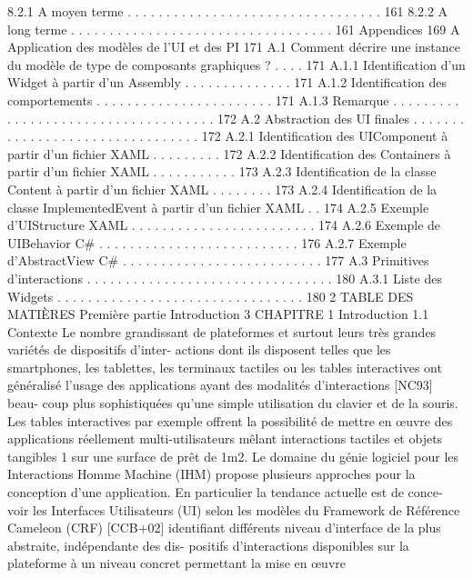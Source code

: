 \documentclass{article}
\begin{document}
8.2.1
A moyen terme . . . . . . . . . . . . . . . . . . . . . . . . . . . . . . . . .
161
8.2.2
A long terme . . . . . . . . . . . . . . . . . . . . . . . . . . . . . . . . . .
161
Appendices
169
A Application des modèles de l’UI et des PI
171
A.1
Comment décrire une instance du modèle de type de composants graphiques ? . . . .
171
A.1.1
Identiﬁcation d’un Widget à partir d’un Assembly
. . . . . . . . . . . . . .
171
A.1.2
Identiﬁcation des comportements
. . . . . . . . . . . . . . . . . . . . . . .
171
A.1.3
Remarque . . . . . . . . . . . . . . . . . . . . . . . . . . . . . . . . . . . .
172
A.2
Abstraction des UI ﬁnales . . . . . . . . . . . . . . . . . . . . . . . . . . . . . . . .
172
A.2.1
Identiﬁcation des UIComponent à partir d’un ﬁchier XAML . . . . . . . . .
172
A.2.2
Identiﬁcation des Containers à partir d’un ﬁchier XAML . . . . . . . . . . .
173
A.2.3
Identiﬁcation de la classe Content à partir d’un ﬁchier XAML . . . . . . . .
173
A.2.4
Identiﬁcation de la classe ImplementedEvent à partir d’un ﬁchier XAML
. .
174
A.2.5
Exemple d’UIStructure XAML
. . . . . . . . . . . . . . . . . . . . . . . .
174
A.2.6
Exemple de UIBehavior C#
. . . . . . . . . . . . . . . . . . . . . . . . . .
176
A.2.7
Exemple d’AbstractView C# . . . . . . . . . . . . . . . . . . . . . . . . . .
177
A.3
Primitives d’interactions
. . . . . . . . . . . . . . . . . . . . . . . . . . . . . . . .
180
A.3.1
Liste des Widgets . . . . . . . . . . . . . . . . . . . . . . . . . . . . . . . .
180
2
TABLE DES MATIÈRES
Première partie
Introduction
3
CHAPITRE 1
Introduction
1.1
Contexte
Le nombre grandissant de plateformes et surtout leurs très grandes variétés de dispositifs d’inter-
actions dont ils disposent telles que les smartphones, les tablettes, les terminaux tactiles ou les tables
interactives ont généralisé l’usage des applications ayant des modalités d’interactions [NC93] beau-
coup plus sophistiquées qu’une simple utilisation du clavier et de la souris. Les tables interactives par
exemple offrent la possibilité de mettre en œuvre des applications réellement multi-utilisateurs mêlant
interactions tactiles et objets tangibles 1 sur une surface de prêt de 1m2.
Le domaine du génie logiciel pour les Interactions Homme Machine (IHM) propose plusieurs
approches pour la conception d’une application. En particulier la tendance actuelle est de conce-
voir les Interfaces Utilisateurs (UI) selon les modèles du Framework de Référence Cameleon
(CRF) [CCB+02] identiﬁant différents niveau d’interface de la plus abstraite, indépendante des dis-
positifs d’interactions disponibles sur la plateforme à un niveau concret permettant la mise en œuvre
\end{document}

